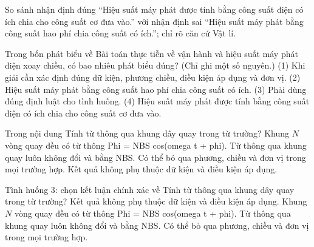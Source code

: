 \begin{bt}
So sánh nhận định đúng “Hiệu suất máy phát được tính bằng công suất điện có ích chia cho công suất cơ đưa vào.” với nhận định sai “Hiệu suất máy phát bằng công suất hao phí chia công suất có ích.”; chỉ rõ căn cứ Vật lí.
\end{bt}

\begin{ex}
Trong bốn phát biểu về Bài toán thực tiễn về vận hành và hiệu suất máy phát điện xoay chiều, có bao nhiêu phát biểu đúng? (Chỉ ghi một số nguyên.) (1) Khi giải cần xác định đúng dữ kiện, phương chiều, điều kiện áp dụng và đơn vị. (2) Hiệu suất máy phát bằng công suất hao phí chia công suất có ích. (3) Phải dùng đúng định luật cho tình huống. (4) Hiệu suất máy phát được tính bằng công suất điện có ích chia cho công suất cơ đưa vào.
\end{ex}

\begin{ex}
Trong nội dung Tính từ thông qua khung dây quay trong từ trường?
\choice
{\True Khung $N$ vòng quay đều có từ thông Phi = NBS cos(omega t + phi).}
{Từ thông qua khung quay luôn không đổi và bằng NBS.}
{Có thể bỏ qua phương, chiều và đơn vị trong mọi trường hợp.}
{Kết quả không phụ thuộc dữ kiện và điều kiện áp dụng.}
\end{ex}

\begin{ex}
Tình huống 3: chọn kết luận chính xác về Tính từ thông qua khung dây quay trong từ trường?
\choice
{Kết quả không phụ thuộc dữ kiện và điều kiện áp dụng.}
{\True Khung $N$ vòng quay đều có từ thông Phi = NBS cos(omega t + phi).}
{Từ thông qua khung quay luôn không đổi và bằng NBS.}
{Có thể bỏ qua phương, chiều và đơn vị trong mọi trường hợp.}
\end{ex}

